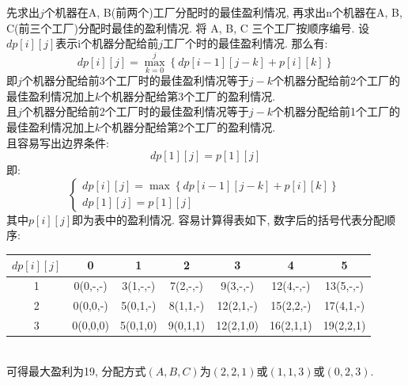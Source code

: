 \documentclass[../../main.tex]{subfiles}
\begin{document}
\begin{solution}
    先求出\(j\)个机器在A, B(前两个)工厂分配时的最佳盈利情况, 再求出n个机器在A, B, C(前三个工厂)分配时最佳的盈利情况.
    将 A, B, C 三个工厂按顺序编号. 设$dp[i][j]$表示i个机器分配给前\(j\)工厂个时的最佳盈利情况.
    那么有:
    \begin{equation*}
        dp[i][j] = \max_{k=0}^{j}\left\{dp[i-1][j-k]+p[i][k]\right\}
    \end{equation*}
    即\(j\)个机器分配给前3个工厂时的最佳盈利情况等于\(j-k\)个机器分配给前2个工厂的最佳盈利情况加上\(k\)个机器分配给第3个工厂的盈利情况.\\
    且\(j\)个机器分配给前2个工厂时的最佳盈利情况等于\(j-k\)个机器分配给前1个工厂的最佳盈利情况加上\(k\)个机器分配给第2个工厂的盈利情况.\\
    且容易写出边界条件:
    \begin{equation*}
        dp[1][j] = p[1][j]
    \end{equation*}
    即:
    \begin{equation*}
        \begin{cases}
            dp[i][j] = \max\left\{dp[i-1][j-k]+p[i][k]\right\} \\
            dp[1][j] = p[1][j]
        \end{cases}
    \end{equation*}
    其中\(p[i][j]\)即为表中的盈利情况.
    容易计算得表如下, 数字后的括号代表分配顺序:
    \begin{table}[h]
        \centering
        \begin{tabular}{|c|c|c|c|c|c|c|}
            \hline
            \(dp[i][j]\) & 0        & 1        & 2        & 3         & 4         & 5         \\ \hline
            1            & 0(0,-,-) & 3(1,-,-) & 7(2,-,-) & 9(3,-,-)  & 12(4,-,-) & 13(5,-,-) \\ \hline
            2            & 0(0,0,-) & 5(0,1,-) & 8(1,1,-) & 12(2,1,-) & 15(2,2,-) & 17(4,1,-) \\ \hline
            3            & 0(0,0,0) & 5(0,1,0) & 9(0,1,1) & 12(2,1,0) & 16(2,1,1) & 19(2,2,1) \\ \hline
        \end{tabular}
    \end{table}
    \\
    可得最大盈利为19, 分配方式\((A,B,C)\)为\((2,2,1)\)或\((1,1,3)\)或\((0,2,3)\).
\end{solution}
\end{document}
